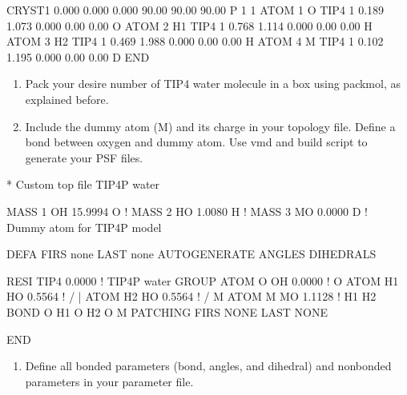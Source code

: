 \documentclass[letterpaper,10pt,english]{sphinxmanual}
\begin{document}
\begin{sphinxVerbatim}[commandchars=\\\{\}]
CRYST1    0.000    0.000    0.000  90.00  90.00  90.00 P 1           1
ATOM      1  O   TIP4    1      \PYGZhy{}0.189   1.073   0.000  0.00  0.00           O
ATOM      2  H1  TIP4    1       0.768   1.114   0.000  0.00  0.00           H
ATOM      3  H2  TIP4    1      \PYGZhy{}0.469   1.988   0.000  0.00  0.00           H
ATOM      4  M   TIP4    1      \PYGZhy{}0.102   1.195   0.000  0.00  0.00           D
END
\end{sphinxVerbatim}
\begin{enumerate}
%
\setcounter{enumi}{1}
\item {} 
Pack your desire number of TIP4 water molecule in a box using packmol, as explained before.

\item {} 
Include the dummy atom (M) and its charge in your topology file. Define a bond between oxygen and dummy atom.
Use vmd and build script to generate your PSF files.

\end{enumerate}

\begin{sphinxVerbatim}[commandchars=\\\{\}]
* Custom top file \PYGZhy{}\PYGZhy{} TIP4P water

MASS   1  OH    15.9994  O !
MASS   2  HO     1.0080  H !
MASS   3  MO     0.0000  D ! Dummy atom for TIP4P model

DEFA FIRS none LAST none
AUTOGENERATE ANGLES DIHEDRALS

RESI TIP4           0.0000 ! TIP4P water
GROUP
ATOM O      OH      0.0000 !        O
ATOM H1     HO      0.5564 !     /  |  \PYGZbs{}
ATOM H2     HO      0.5564 !    /   M   \PYGZbs{}
ATOM M      MO     \PYGZhy{}1.1128 !  H1        H2
BOND   O  H1   O  H2   O  M
PATCHING FIRS NONE LAST NONE

END
\end{sphinxVerbatim}
\begin{enumerate}
%
\setcounter{enumi}{3}
\item {} 
Define all bonded parameters (bond, angles, and dihedral) and nonbonded parameters in your parameter file.

\end{enumerate}
\end{document}
